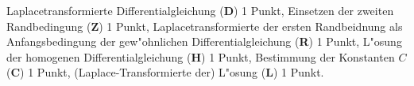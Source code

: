 \begin{bewertung}
Laplacetransformierte Differentialgleichung ({\bf D}) 1 Punkt,
Einsetzen der zweiten Randbedingung ({\bf Z}) 1 Punkt,
Laplacetransformierte der ersten Randbeidnung als Anfangsbedingung
der gew"ohnlichen Differentialgleichung ({\bf R}) 1 Punkt,
L"osung der homogenen Differentialgleichung ({\bf H}) 1 Punkt,
Bestimmung der Konstanten $C$ ({\bf C}) 1 Punkt,
(Laplace-Transformierte der) L"osung ({\bf L}) 1 Punkt.
\end{bewertung}
